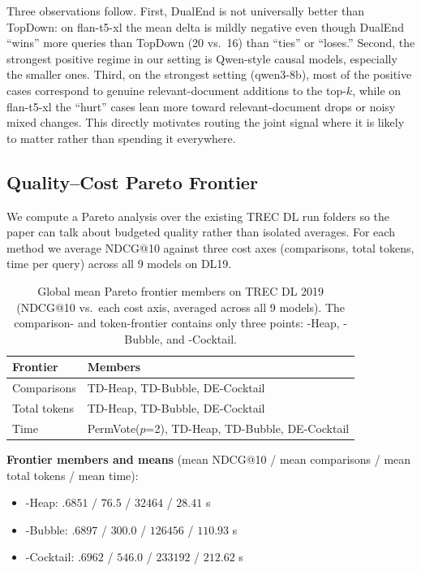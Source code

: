 Three observations follow. First, DualEnd is not universally better than TopDown: on flan-t5-xl the mean delta is mildly negative even though DualEnd ``wins'' more queries than TopDown (20 vs.\ 16) than ``ties'' or ``loses.'' Second, the strongest positive regime in our setting is Qwen-style causal models, especially the smaller ones. Third, on the strongest setting (qwen3-8b), most of the positive cases correspond to genuine relevant-document additions to the top-$k$, while on flan-t5-xl the ``hurt'' cases lean more toward relevant-document drops or noisy mixed changes. This directly motivates routing the joint signal where it is likely to matter rather than spending it everywhere.


\subsection{Quality--Cost Pareto Frontier}
\label{sec:pareto}

We compute a Pareto analysis over the existing TREC DL run folders so the paper can talk about budgeted quality rather than isolated averages. For each method we average NDCG@10 against three cost axes (comparisons, total tokens, time per query) across all 9 models on DL19.

\begin{table}[!htbp]
\caption{Global mean Pareto frontier members on TREC DL 2019 (NDCG@10 vs.\ each cost axis, averaged across all 9 models). The comparison- and token-frontier contains only three points: \topdown{}-Heap, \topdown{}-Bubble, and \dualend{}-Cocktail.}
\label{tab:pareto}
\small
\begin{tabular}{lp{}}
\toprule
Frontier & Members \\
\midrule
Comparisons & TD-Heap, TD-Bubble, DE-Cocktail \\
Total tokens & TD-Heap, TD-Bubble, DE-Cocktail \\
Time & PermVote($p$=2), TD-Heap, TD-Bubble, DE-Cocktail \\
\bottomrule
\end{tabular}
\end{table}

\textbf{Frontier members and means} (mean NDCG@10 / mean comparisons / mean total tokens / mean time):
\begin{itemize}[leftmargin=*]
\item \topdown{}-Heap: $.6851$ / $76.5$ / $32464$ / $28.41$ s
\item \topdown{}-Bubble: $.6897$ / $300.0$ / $126456$ / $110.93$ s
\item \dualend{}-Cocktail: $.6962$ / $546.0$ / $233192$ / $212.62$ s
\end{itemize}

